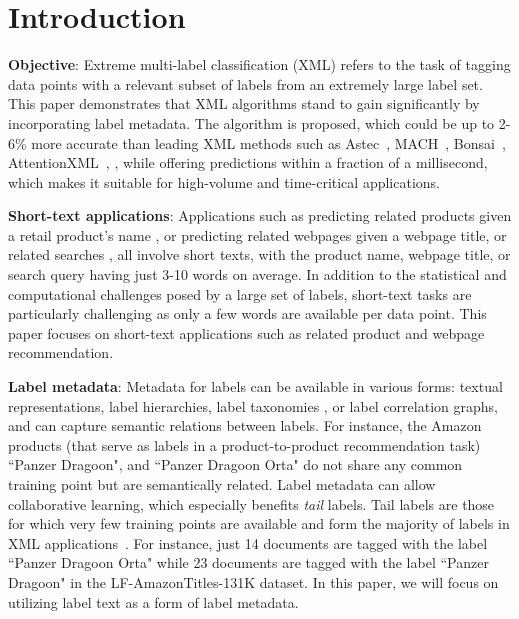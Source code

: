 \section{Introduction}
\label{sec:intro}

\textbf{Objective}: Extreme multi-label classification (XML) refers to the task of tagging data points with a relevant subset of labels from an extremely large label set. This paper demonstrates that XML algorithms stand to gain significantly by incorporating label metadata. The \alg algorithm is proposed, which could be up to 2-6\% more accurate than leading XML methods such as Astec~\citep{Dahiya21}, MACH~\cite{Medini2019}, Bonsai~\citep{Khandagale19}, AttentionXML~\citep{You18}, \etc, while offering predictions within a fraction of a millisecond, which makes it suitable for high-volume and time-critical applications.

\textbf{Short-text applications}: Applications such as predicting related products given a retail product's name \cite{Medini2019}, or predicting related webpages given a webpage title, or related searches \cite{Jain19}, all involve short texts, with the product name, webpage title, or search query having just 3-10 words on average. In addition to the statistical and computational challenges posed by a large set of labels, short-text tasks are particularly challenging as only a few words are available per data point. This paper focuses on short-text applications such as related product and webpage recommendation.

\textbf{Label metadata}: Metadata for labels can be available in various forms: textual representations, label hierarchies, label taxonomies \cite{Kanagal12, menon11, sachdeva19}, or label correlation graphs, and can capture semantic relations between labels. For instance, the Amazon products (that serve as labels in a product-to-product recommendation task) ``Panzer Dragoon", and ``Panzer Dragoon Orta" do not share any common training point but are semantically related. Label metadata can allow collaborative learning, which especially benefits \emph{tail} labels. Tail labels are those for which very few training points are available and form the majority of labels in XML applications~\citep{Jain16, Babbar17, Babbar19}. For instance, just 14 documents are tagged with the label ``Panzer Dragoon Orta" while 23 documents are tagged with the label ``Panzer Dragoon" in the LF-AmazonTitles-131K dataset. In this paper, we will focus on utilizing label text as a form of label metadata.

